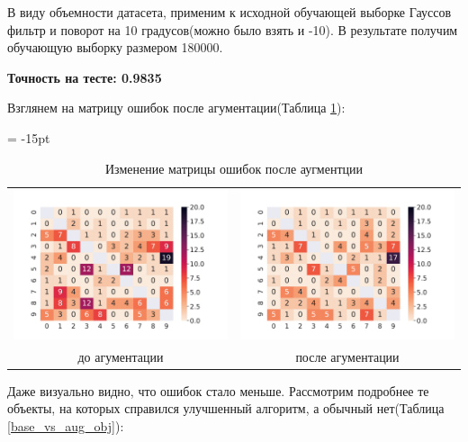 \documentclass[12pt,fleqn]{article}
\begin{document}
В виду объемности датасета, применим к исходной обучающей выборке Гауссов фильтр и поворот на 10 градусов(можно было взять и -10).
В результате получим обучающую выборку размером 180000.

\newpage
\textbf{Точность на тесте: 0.9835}

Взглянем на матрицу ошибок после агументации(Таблица \ref{conf_matrix_aug}):

\begin{table}[htb]
    \centering
    \tabcolsep = -15pt
    \begin{tabular}{cc}
        \includegraphics[width=10cm]{task4.pdf} & \includegraphics[width=10cm]{task5_conf_mat.pdf}\\
        до агументации & после агументации 
    \end{tabular}
    \caption{Изменение матрицы ошибок после аугментции}
    \label{conf_matrix_aug}
\end{table}

Даже визуально видно, что ошибок стало меньше. Рассмотрим подробнее те объекты, 
на которых справился улучшенный алгоритм, а обычный нет(Таблица \ref{base_vs_aug_obj}):
\end{document}
